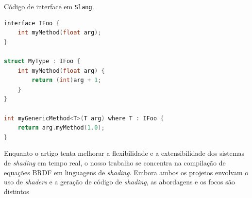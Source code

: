 \begin{codigo}[H]
  \caption{\small Código de interface em \texttt{Slang}. }
  \label{cod-sland}
\begin{lstlisting}[language=C, frame=none, inputencoding=utf8]
interface IFoo {
    int myMethod(float arg);
}

struct MyType : IFoo {
    int myMethod(float arg) {
        return (int)arg + 1;
    }
}

int myGenericMethod<T>(T arg) where T : IFoo {
    return arg.myMethod(1.0);
}
\end{lstlisting}
\end{codigo}

Enquanto o artigo tenta melhorar a flexibilidade e a extensibilidade dos sistemas de \textit{shading} em tempo real, o nosso trabalho se concentra na compilação de equações BRDF em linguagens de \textit{shading}. Embora ambos os projetos envolvam o uso de \textit{shaders} e a geração de código de \textit{shading}, as abordagens e os focos são distintos

%
%
%
%
%
%
%
%


